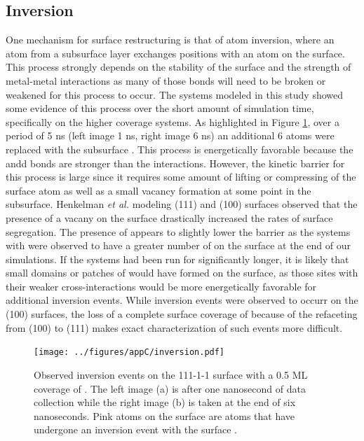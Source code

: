 \subsection{Inversion}
One mechanism for surface restructuring is that of atom inversion, where an
atom from a subsurface layer exchanges positions with an atom on the surface.
This process strongly depends on the stability of the surface and the strength
of metal-metal interactions as many of those bonds will need to be broken or
weakened for this process to occur.  The  systems modeled in this
study showed some evidence of this process over the short amount of simulation
time, specifically on the higher  coverage systems. As highlighted in
Figure \ref{fig:inversion}, over a period of 5 ns (left image 1 ns, right image
6 ns) an additional 6  atoms were replaced with the subsurface .
This process is energetically favorable because the  andd
 bonds are stronger than the  interactions.
However, the kinetic barrier for this process is large since it requires some
amount of lifting or compressing of the surface atom as well as a small vacancy
formation at some point in the subsurface. Henkelman {\em et al.} modeling
(111) and (100)  surfaces observed that the presence of a vacany on
the surface drastically increased the rates of surface
segregation.\citep{Kim:2013mi} The presence of  appears to slightly
lower the barrier as the systems with  were observed to have a greater
number of  on the surface at the end of our simulations. If the systems
had been run for significantly longer, it is likely that small domains or
patches of  would have formed on the surface, as those sites with their
weaker cross-interactions would be more energetically favorable for additional
inversion events. While inversion events were observed to occurr on the (100)
surfaces, the loss of a complete surface coverage of  because of the
refaceting from (100) to (111) makes exact characterization of such events more difficult.


\begin{figure}[p!]
\centering
\texttt{[image: ../figures/appC/inversion.pdf]}
\caption{Observed inversion events on the 111-1-1 surface with a
0.5 ML coverage of . The left image (a) is after one nanosecond of data
collection while the right image (b) is taken at the end of six nanoseconds.
Pink atoms on the surface are  atoms that have undergone an inversion
event with the surface .}
\label{fig:inversion}
\end{figure}

